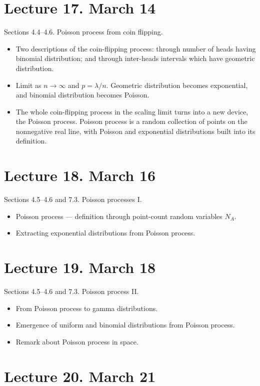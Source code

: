 \documentclass[letterpaper,11pt,oneside,reqno]{amsart}
\numberwithin{equation}{section}
\theoremstyle{definition}
\begin{document}
\section*{Lecture 17. March 14}

Sections 4.4--4.6. Poisson process from coin flipping.
\begin{itemize}
	\item Two descriptions of the coin-flipping process: through number of heads having
		binomial distribution; and through inter-heads intervals which
		have geometric distribution.
	\item Limit as $n\to\infty$ and $p=\lambda/n$. Geometric
		distribution becomes exponential, and 
		binomial distribution becomes Poisson.
	\item The whole coin-flipping process in the scaling limit
		turns into a new device, the Poisson process. 
		Poisson process is a random collection of points on the 
		nonnegative real line, with Poisson and exponential distributions
		built into its definition.
\end{itemize}

\section*{Lecture 18. March 16}

Sections 4.5--4.6 and 7.3. Poisson processes I.
\begin{itemize}
	\item Poisson process --- definition through point-count random variables
		$N_A$.
	\item Extracting exponential distributions from 
		Poisson process.
\end{itemize}

\section*{Lecture 19. March 18}

Sections 4.5--4.6 and 7.3. Poisson process II.
\begin{itemize}
	\item From Poisson process to gamma distributions.
	\item Emergence of uniform and binomial distributions from Poisson process.
	\item Remark about Poisson process in space.
\end{itemize}

\section*{Lecture 20. March 21}
\end{document}
